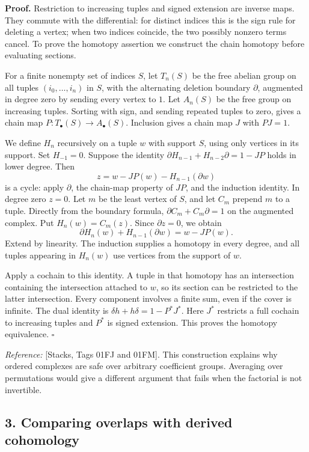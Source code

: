 \documentclass[11pt]{article}
\begin{document}
\textbf{Proof.} Restriction to increasing tuples and signed extension
are inverse maps. They commute with the differential: for distinct
indices this is the sign rule for deleting a vertex; when two indices
coincide, the two possibly nonzero terms cancel. To prove the homotopy
assertion we construct the chain homotopy before evaluating sections.

For a finite nonempty set of indices \(S\), let \(T_n(S)\) be the free
abelian group on all tuples \((i_0,\ldots,i_n)\) in \(S\), with the
alternating deletion boundary \(\partial\), augmented in degree zero by
sending every vertex to \(1\). Let \(A_n(S)\) be the free group on
increasing tuples. Sorting with sign, and sending repeated tuples to
zero, gives a chain map \(P:T_\bullet(S)\to A_\bullet(S)\). Inclusion
gives a chain map \(J\) with \(PJ=1\).

We define \(H_n\) recursively on a tuple \(w\) with support \(S\), using
only vertices in its support. Set \(H_{-1}=0\). Suppose the identity
\(\partial H_{n-1}+H_{n-2}\partial=1-JP\) holds in lower degree. Then \[
z=w-JP(w)-H_{n-1}(\partial w)
\] is a cycle: apply \(\partial\), the chain-map property of \(JP\), and
the induction identity. In degree zero \(z=0\). Let \(m\) be the least
vertex of \(S\), and let \(C_m\) prepend \(m\) to a tuple. Directly from
the boundary formula, \(\partial C_m+C_m\partial=1\) on the augmented
complex. Put \(H_n(w)=C_m(z)\). Since \(\partial z=0\), we obtain \[
\partial H_n(w)+H_{n-1}(\partial w)=w-JP(w).
\] Extend by linearity. The induction supplies a homotopy in every
degree, and all tuples appearing in \(H_n(w)\) use vertices from the
support of \(w\).

Apply a cochain to this identity. A tuple in that homotopy has an
intersection containing the intersection attached to \(w\), so its
section can be restricted to the latter intersection. Every component
involves a finite sum, even if the cover is infinite. The dual identity
is \(\delta h+h\delta=1-P^*J^*\). Here \(J^*\) restricts a full cochain
to increasing tuples and \(P^*\) is signed extension. This proves the
homotopy equivalence. \(\square\)

\emph{Reference:} {[}Stacks, Tags 01FJ and 01FM{]}. This construction
explains why ordered complexes are safe over arbitrary coefficient
groups. Averaging over permutations would give a different argument that
fails when the factorial is not invertible.

\subsection{3. Comparing overlaps with derived
cohomology}\label{comparing-overlaps-with-derived-cohomology}
\end{document}
